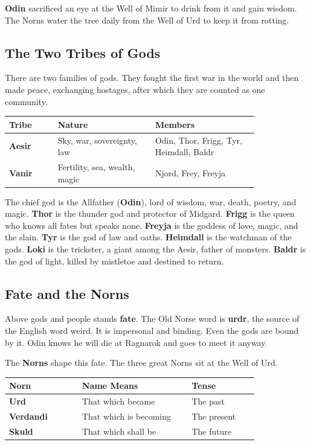 \textbf{Odin} sacrificed an eye at the Well of Mimir to drink from it and gain wisdom. The Norns water the tree daily from the Well of Urd to keep it from rotting.

\subsection{The Two Tribes of Gods}

There are two families of gods. They fought the first war in the world and then made peace, exchanging hostages, after which they are counted as one community.

\begin{longtable}{L{0.16\linewidth}
L{0.32\linewidth} L{0.34\linewidth}}
\toprule
\textbf{Tribe} & \textbf{Nature} & \textbf{Members} \\
\midrule
\textbf{Aesir} & Sky, war, sovereignty, law & Odin, Thor, Frigg, Tyr, Heimdall, Baldr \\
\textbf{Vanir} & Fertility, sea, wealth, magic & Njord, Frey, Freyja \\
\bottomrule
\end{longtable}

The chief god is the Allfather (\textbf{Odin}), lord of wisdom, war, death, poetry, and magic. \textbf{Thor} is the thunder god and protector of Midgard. \textbf{Frigg} is the queen who knows all fates but speaks none. \textbf{Freyja} is the goddess of love, magic, and the slain. \textbf{Tyr} is the god of law and oaths. \textbf{Heimdall} is the watchman of the gods. \textbf{Loki} is the trickster, a giant among the Aesir, father of monsters. \textbf{Baldr} is the god of light, killed by mistletoe and destined to return.

\subsection{Fate and the Norns}

Above gods and people stands \textbf{fate}. The Old Norse word is \textbf{urdr}, the source of the English word weird. It is impersonal and binding. Even the gods are bound by it. Odin knows he will die at Ragnarok and goes to meet it anyway.

The \textbf{Norns} shape this fate. The three great Norns sit at the Well of Urd.

\begin{longtable}{L{0.24\linewidth}
L{0.36\linewidth} L{0.22\linewidth}}
\toprule
\textbf{Norn} & \textbf{Name Means} & \textbf{Tense} \\
\midrule
\textbf{Urd} & That which became & The past \\
\textbf{Verdandi} & That which is becoming & The present \\
\textbf{Skuld} & That which shall be & The future \\
\bottomrule
\end{longtable}

